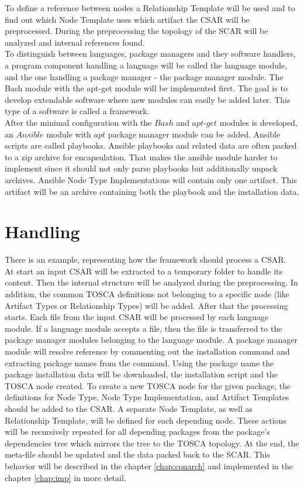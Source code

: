 To define a reference between nodes a Relationship Template will be used and to find out which Node Template uses which artifact the CSAR will be preprocessed.
During the preprocessing the topology of the SCAR will be analyzed and internal references found.\\
To distinguish between languages, package managers and they software handlers, a program component handling a language will be called the language module, and the one handling a package manager - the package manager module.
The Bash module with the apt-get module will be implemented first. 
The goal is to develop extendable software where new modules can easily be added later.
This type of a software is called a framework.\\
After the minimal configuration with the $Bash$ and $apt$-$get$ modules is developed, an $Ansible$ module with $apt$ package manager module can be added. 
Ansible scripts are called playbooks. 
Ansible playbooks and related data are often packed to a zip archive for encapsulation.
That makes the ansible module harder to implement since it should not only parse playbooks but additionally unpack archives. Ansible Node Type Implementations will contain only one artifact.
This artifact will be an archive containing both the playbook and the installation data.
\section*{Handling}
There is an example, representing how the framework should process a CSAR.\\
At start an input CSAR will be extracted to a temporary folder to handle its content.
Then the internal structure will be analyzed during the preprocessing. 
In addition, the common TOSCA definitions not belonging to a specific node (like Artifact Types or Relationship Types) will be added. 
After that the processing starts. 
Each file from the input CSAR will be processed by each language module.
If a language module accepts a file, then the file is transferred to the package manager modules belonging to the language module.
A package manager module will resolve reference by commenting out the installation command and extracting package names from the command.
Using the package name the package installation data will be downloaded, the installation script and the TOSCA node created. 
To create a new TOSCA node for the given package, the definitions for Node Type, Node Type Implementation, and Artifact Templates should be added to the CSAR. 
A separate Node Template, as well as Relationship Template, will be defined for each depending node.
These actions will be recursively repeated for all depending packages from the package's dependencies tree which mirrors the tree to the TOSCA topology.
At the end, the meta-file should be updated and the data packed back to the SCAR. %
This behavior will be described in the chapter \ref{chap:conarch} and implemented in the chapter \ref{chap:imp} in more detail.
\fi
